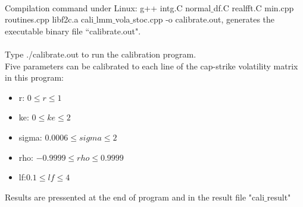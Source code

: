 \documentclass[12pt]{article}
\theoremstyle{definition}
\numberwithin{equation}{section} \theoremstyle{remark}
\begin{document}
\\
\noindent Compilation command under Linux: g++ intg.C normal$\_$df.C
realfft.C min.cpp routines.cpp libf2c.a
cali$\_$lmm$\_$vola$\_$stoc.cpp -o calibrate.out, generates the
executable binary file
``calibrate.out".\\


 \\
\noindent Type ./calibrate.out to run the calibration program.\\

 Five parameters can be calibrated to each line of the cap-strike volatility matrix in this program:
\begin{itemize}
\item r: $0\leq r \leq 1$

\item ke: $0 \leq ke \leq 2$

\item sigma: $0.0006 \leq sigma \leq 2$

\item rho: $-0.9999 \leq rho \leq 0.9999$

\item lf:$ 0.1 \leq lf \leq 4$
\end{itemize}

\noindent Results are pressented at the end of program and in the
result file "cali$\_$result"

 
\end{document}

